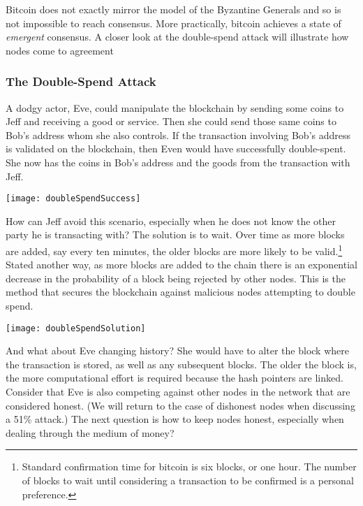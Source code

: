 Bitcoin does not exactly mirror the model of the Byzantine Generals and so is not impossible to reach consensus. More practically, bitcoin achieves a state of \textit{emergent} consensus. A closer look at the double-spend attack will illustrate how nodes come to agreement

\subsubsection*{The Double-Spend Attack}
A dodgy actor, Eve, could manipulate the blockchain by sending some coins to Jeff and receiving a good or service. Then she could send those same coins to Bob's address whom she also controls. If the transaction involving Bob's address is validated on the blockchain, then Even would have successfully double-spent. She now has the coins in Bob's address and the goods from the transaction with Jeff.\\
\begin{center}
\texttt{[image: doubleSpendSuccess]}
\end{center}
How can Jeff avoid this scenario, especially when he does not know the other party he is transacting with? The solution is to wait. Over time as more blocks are added, say every ten minutes, the older blocks are more likely to be valid.\footnote{Standard confirmation time for bitcoin is six blocks, or one hour. The number of blocks to wait until considering a transaction to be confirmed is a personal preference.} Stated another way, as more blocks are added to the chain there is an exponential decrease in the probability of a block being rejected by other nodes. This is the method that secures the blockchain against malicious nodes attempting to double spend. 




\begin{center}
	\texttt{[image: doubleSpendSolution]}
\end{center}

And what about Eve changing history? She would have to alter the block where the transaction is stored, as well as any subsequent blocks. The older the block is, the more computational effort is required because the hash pointers are linked. Consider that Eve is also competing against other nodes in the network that are considered honest. (We will return to the case of dishonest nodes when discussing a 51\% attack.) The next question is how to keep nodes honest, especially when dealing through the medium of money? 

